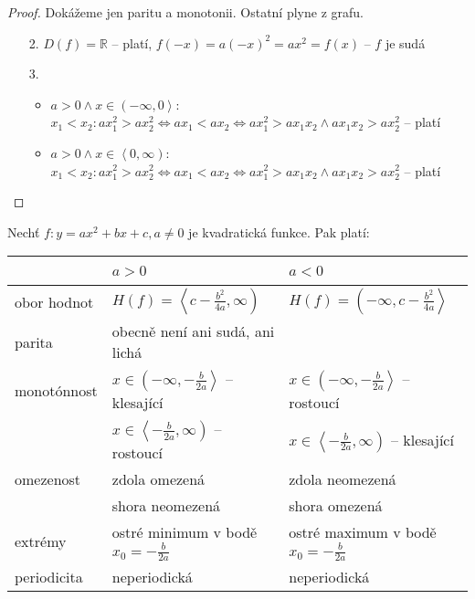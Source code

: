 \begin{proof}
    Dokážeme jen paritu a monotonii. Ostatní plyne z grafu.
    \begin{enumerate}[2.]
        \item[2.] $D(f) = \mathbb R$ -- platí, $f(-x)=a(-x)^2=ax^2=f(x)$ -- $f$ je sudá
        \item[3.] \begin{itemize}
        \item $a>0 \land x\in \left (-\infty,0\right >$: \\
        $x_1<x_2:ax_1^2 > ax_2^2 \iff ax_1 <ax_2 \iff ax_1^2>ax_1x_2 \land ax_1x_2 > ax_2^2$ -- platí
            \item $a>0 \land x\in \left <0,\infty\right )$: \\
            $x_1<x_2:ax_1^2 > ax_2^2 \iff ax_1 <ax_2 \iff ax_1^2>ax_1x_2 \land ax_1x_2 > ax_2^2$ -- platí\qedhere
        \end{itemize}
    \end{enumerate}
\end{proof}

\begin{veta}
  Nechť $f:y = ax^2+bx+c, a \neq 0$ je kvadratická funkce. Pak platí:\\
  \begin{center}
    \begin{tabularx}{\textwidth}{ l | l  l }
        \, & $a>0$ & $a<0$ \\
        \hline
        obor hodnot & $H(f) = \left <c-\frac{b^2}{4a}, \infty \right)$ & $H(f) = \left (-\infty, c-\frac{b^2}{4a}\right >$ \\
        parita & obecně není ani sudá, ani lichá & \, \\
        monotónnost & $x \in \left (-\infty, -\frac{b}{2a} \right >$ -- klesající & $x \in \left (-\infty, -\frac{b}{2a} \right >$ -- rostoucí \\
        \, & $x \in \left < -\frac{b}{2a}, \infty \right )$ -- rostoucí & $x \in \left < -\frac{b}{2a}, \infty \right )$ -- klesající \\
        omezenost & zdola omezená & zdola neomezená \\
        \, & shora neomezená & shora omezená \\
        extrémy &  ostré minimum v bodě $x_0=-\frac{b}{2a}$ & ostré maximum v bodě $x_0=-\frac{b}{2a}$ \\
        periodicita & neperiodická & neperiodická
    \end{tabularx}
  \end{center}
\end{veta}

